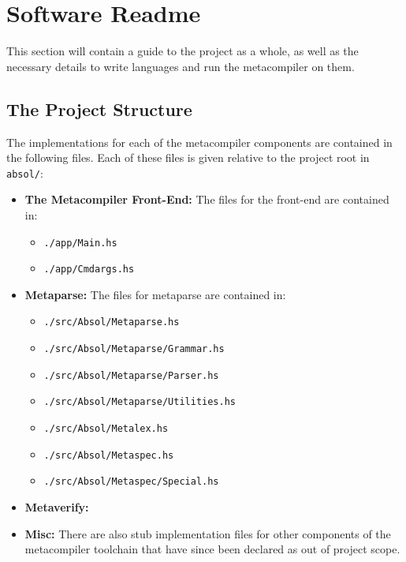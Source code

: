 \chapter{Software Readme} %
\label{cha:software_readme}
This section will contain a guide to the project as a whole, as well as the necessary details to write languages and run the metacompiler on them.

\section{The Project Structure} %
\label{sec:the_project_structure}
The implementations for each of the metacompiler components are contained in the following files. 
Each of these files is given relative to the project root in \texttt{absol/}:
\begin{itemize}
    \item \textbf{The Metacompiler Front-End:} The files for the front-end are contained in:
    \begin{itemize}
        \item \texttt{./app/Main.hs}
        \item \texttt{./app/Cmdargs.hs}
    \end{itemize}
    \item \textbf{Metaparse:} The files for metaparse are contained in:
    \begin{itemize}
        \item \texttt{./src/Absol/Metaparse.hs}
        \item \texttt{./src/Absol/Metaparse/Grammar.hs}
        \item \texttt{./src/Absol/Metaparse/Parser.hs}
        \item \texttt{./src/Absol/Metaparse/Utilities.hs}
        \item \texttt{./src/Absol/Metalex.hs}
        \item \texttt{./src/Absol/Metaspec.hs}
        \item \texttt{./src/Absol/Metaspec/Special.hs}
    \end{itemize}
    \item \textbf{Metaverify:}
    \item \textbf{Misc:} There are also stub implementation files for other components of the metacompiler toolchain that have since been declared as out of project scope. 
\end{itemize}

